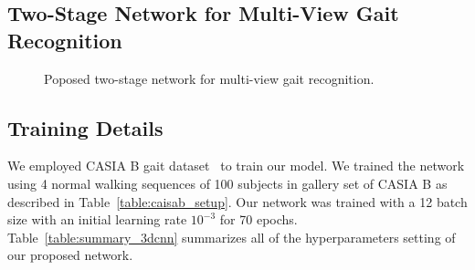 \subsection{Two-Stage Network for Multi-View Gait Recognition}
\begin{figure}[t]
	\caption[Poposed two-stage network for multi-view gait recognition.]
	{Poposed two-stage network for multi-view gait recognition.\label{fig:two-stage_network}
	}
\end{figure}


\subsection{Training Details}
We employed CASIA B gait dataset~\cite{Yu_06} to train our model. We trained the network using 4 normal walking sequences of 100 subjects in gallery set of CASIA B as described in Table~\ref{table:caisab_setup}. Our network was trained with a 12 batch size with an initial learning rate ${10^{-3}}$ for 70 epochs. Table~\ref{table:summary_3dcnn} summarizes all of the hyperparameters setting of our proposed network.


